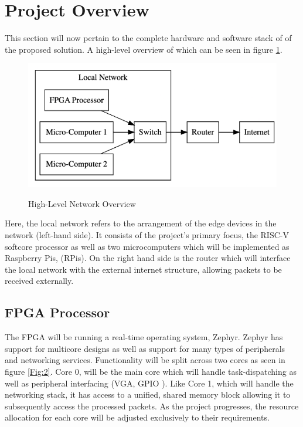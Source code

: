 \section{Project Overview}
\label{sec:Project Overview}
This section will now pertain to the complete hardware and software stack of of the proposed solution. A high-level overview of which can be seen in figure \ref{Fig:1}.

\begin{figure}[h]
    \begin{center}
    \caption{High-Level Network Overview}
    \includegraphics[width=1.0\textwidth]{./Figures/Network_Overview.png}
    \label{Fig:1}
    \end{center}
\end{figure}

Here, the local network refers to the arrangement of the edge devices in the network (left-hand side). It consists of the project's primary focus, the RISC-V softcore processor as well as two microcomputers which will be implemented as Raspberry Pis, (RPis). On the right hand side is the router which will interface the local network with the external internet structure, allowing packets to be received externally.

\subsection{FPGA Processor}
The FPGA will be running a real-time operating system, Zephyr. Zephyr has support for multicore designs as well as support for many types of peripherals and networking services. Functionality will be split across two cores as seen in figure \ref{Fig:2}. Core 0, will be the main core which will handle task-dispatching as well as peripheral interfacing (VGA, GPIO \etc). Like Core 1, which will handle the networking stack, it has access to a unified, shared memory block allowing it to subsequently access the processed packets. As the project progresses, the resource allocation for each core will be adjusted exclusively to their requirements.
